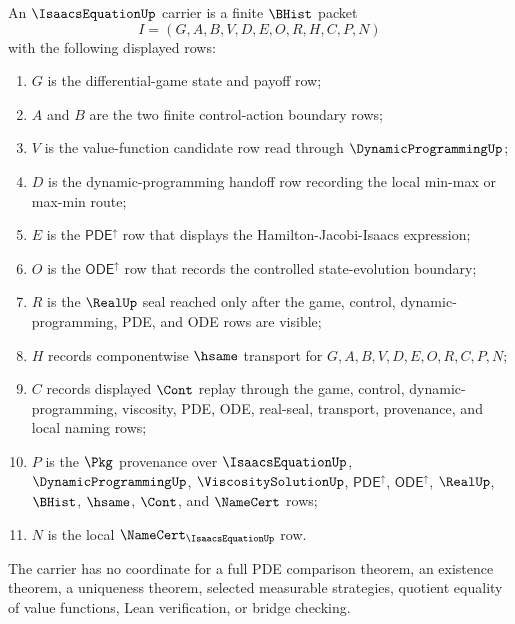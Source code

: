 \begin{definition}
\label{def:isaacs-equation-carrier}
An $\IsaacsEquationUp$ carrier is a finite $\BHist$ packet
$$
I=(G,A,B,V,D,E,O,R,H,C,P,N)
$$
with the following displayed rows:
\begin{enumerate}
\item $G$ is the differential-game state and payoff row;
\item $A$ and $B$ are the two finite control-action boundary rows;
\item $V$ is the value-function candidate row read through $\DynamicProgrammingUp$;
\item $D$ is the dynamic-programming handoff row recording the local min-max or max-min route;
\item $E$ is the $\mathsf{PDE}^{\uparrow}$ row that displays the Hamilton-Jacobi-Isaacs expression;
\item $O$ is the $\mathsf{ODE}^{\uparrow}$ row that records the controlled state-evolution boundary;
\item $R$ is the $\RealUp$ seal reached only after the game, control, dynamic-programming, PDE, and ODE rows are visible;
\item $H$ records componentwise $\hsame$ transport for $G,A,B,V,D,E,O,R,C,P,N$;
\item $C$ records displayed $\Cont$ replay through the game, control, dynamic-programming, viscosity, PDE, ODE, real-seal, transport, provenance, and local naming rows;
\item $P$ is the $\Pkg$ provenance over $\IsaacsEquationUp$, $\DynamicProgrammingUp$, $\ViscositySolutionUp$, $\mathsf{PDE}^{\uparrow}$, $\mathsf{ODE}^{\uparrow}$, $\RealUp$, $\BHist$, $\hsame$, $\Cont$, and $\NameCert$ rows;
\item $N$ is the local $\NameCert_{\IsaacsEquationUp}$ row.
\end{enumerate}
The carrier has no coordinate for a full PDE comparison theorem, an existence theorem, a uniqueness theorem, selected measurable strategies, quotient equality of value functions, Lean verification, or bridge checking.
\end{definition}

